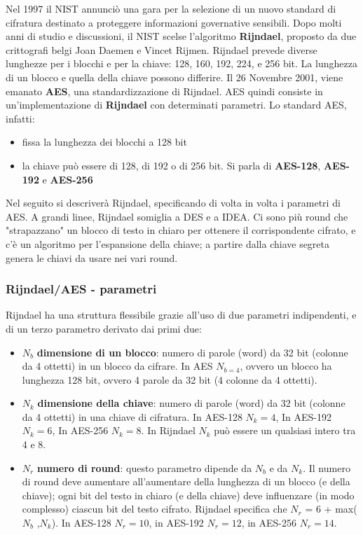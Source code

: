 Nel 1997 il NIST annunciò una gara per la selezione di un nuovo standard di cifratura destinato a proteggere informazioni governative sensibili. Dopo molti anni di studio e discussioni, il NIST scelse l'algoritmo \textbf{Rijndael}, proposto da due crittografi belgi Joan Daemen e Vincet Rijmen. Rijndael prevede diverse lunghezze per i blocchi e
per la chiave: 128, 160, 192, 224, e 256 bit. La lunghezza di un blocco e quella della chiave possono differire. Il 26 Novembre 2001, viene emanato \textbf{AES}, una standardizzazione di Rijndael. AES quindi consiste in un'implementazione di \textbf{Rijndael} con determinati parametri. Lo standard AES, infatti:
\begin{itemize}
  \item fissa la lunghezza dei blocchi a 128 bit
  \item la chiave può essere di 128, di 192 o di 256 bit. Si parla di \textbf{AES-128}, \textbf{AES-192} e \textbf{AES-256}
\end{itemize}

Nel seguito si descriverà Rijndael, specificando di volta in volta i parametri di AES. A grandi linee, Rijndael somiglia a DES e a IDEA. Ci sono più round che "strapazzano" un blocco di testo in chiaro per ottenere il corrispondente cifrato, e c'è un algoritmo per l'espansione della chiave; a partire dalla chiave segreta genera le chiavi da usare nei vari round.

\subsubsection{Rijndael/AES - parametri}
Rijndael ha una struttura flessibile grazie all'uso di due parametri indipendenti, e di un terzo parametro derivato dai primi due:
\begin{itemize}
  \item $N_{b}$ \textbf{dimensione di un blocco}: numero di parole (word) da 32 bit (colonne da 4 ottetti) in un blocco da cifrare. In AES $N_{b = 4}$, ovvero un blocco ha lunghezza 128 bit, ovvero 4 parole da 32 bit (4 colonne da 4 ottetti).
  \item $N_{k}$ \textbf{dimensione della chiave}: numero di parole (word) da 32 bit (colonne da 4 ottetti) in una chiave di cifratura. In AES-128 $N_{k} = 4$, In AES-192 $N_{k} = 6$, In AES-256 $N_{k} = 8$. In Rijndael $N_{k}$ può essere un qualsiasi intero tra 4 e 8.
  \item $N_{r}$ \textbf{numero di round}: questo parametro dipende da $N_{b}$ e da $N_{k}$. Il numero di round deve aumentare all'aumentare della lunghezza di un blocco (e della chiave); ogni bit del testo in chiaro (e della chiave) deve influenzare (in modo complesso) ciascun bit del testo cifrato. Rijndael specifica che $N_{r}$ = 6 + max($N_{b}$ ,$N_{k}$). In AES-128 $N_{r} = 10$, in AES-192 $N_{r} = 12$, in AES-256 $N_{r} = 14$.
\end{itemize}
  
